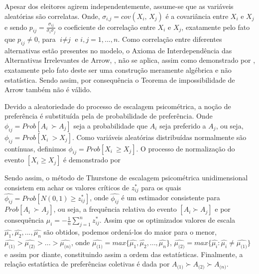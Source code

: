 \documentclass[
	article,			%
	12pt,				%
	oneside,			%
	a4paper,			%
	english,			%
	brazil,				%
	]{abntex2}
\begin{document}
Apesar dos eleitores agirem independentemente, assume-se que as variáveis aleatórias são correlatas. Onde, $\sigma_\textit{i,j} = cov(X_\textit{i}, \, X_\textit{j})$ é a covariância entre $X_\textit{i}$ e $X_\textit{j}$ e sendo $p_\textit{ij} =  \frac{\sigma_\textit{ij}}{\sigma_\textit{i} \sigma_\textit{j}}$ o coeficiente de correlação entre 
$X_\textit{i}$ e $X_\textit{j}$, exatamente pelo fato que $p_\textit{ij} \neq 0$, para $\textit{i} \neq \textit{j}$ e $\textit{i}, \textit{j} = 1, ... , \textit{n}$. Como correlação entre diferentes alternativas estão presentes no modelo, o Axioma de Interdependência das Alternativas Irrelevantes de Arrow, , não se aplica, assim como demonstrado por , exatamente pelo fato deste ser uma construção meramente algébrica e não estatística. Sendo assim, por consequência o Teorema de impossibilidade de Arrow também não é válido.

Devido a aleatoriedade do processo de escalagem psicométrica, a noção de preferência é substituída pela de probabilidade de preferência. Onde $\phi_\textit{ij} = Prob[A_\textit{i} \ \succ A_\textit{j}]$ seja a probabilidade que $A_\textit{i}$ seja preferido a $A_\textit{j}$, ou seja, $\phi_\textit{ij} = Prob[X_\textit{i} \ > X_\textit{j}]$. Como variáveis aleatórias distribuídas normalmente são contínuas, definimos 
$\phi_\textit{ij} = Prob[X_\textit{i} \ \geq X_\textit{j}]$. O processo de normalização do evento $[X_\textit{i} \geq X_\textit{j}]$ é demonstrado por 

Sendo assim, o método de Thurstone de escalagem psicométrica unidimensional consistem em achar os valores críticos de $z^*_\textit{ij}$ para os quais $\hat {\phi_\textit{ij}} = Prob[N(0,1) \geq z^*_\textit{ij}]$, onde $\hat {\phi_\textit{ij}}$ é um estimador consistente para $Prob[A_\textit{i} \ \succ A_\textit{j}]$, ou seja, a frequência relativa do evento $[A_\textit{i} \succ A_\textit{j}]$ e por consequência $\hat {\mu_\textit{i}} = - \frac{1}{n} \sum_{j=1}^{n} z^*_\textit{ij}$. Assim que os optimizados valores de escala $\hat {\mu_\textit{1}}, \hat {\mu_\textit{2}}, ..., \hat {\mu_\textit{n}}$ são obtidos, podemos ordená-los do maior para o menor, $\hat {\mu_\textit{(1)}} > \hat {\mu_\textit{(2)}} >  ... > \hat {\mu_\textit{(n)}}$, onde $\hat {\mu_\textit{(1)}} = max \{ \hat {\mu_\textit{1}}, \hat {\mu_\textit{2}}, ..., \hat {\mu_\textit{n}} \}$, $\hat {\mu_\textit{(2)}} = max \{ \hat {\mu_\textit{i}} : \hat {\mu_\textit{i}} \neq \hat {\mu_\textit{(1)}} \}$ e assim por diante, constituindo assim a ordem das estatísticas. Finalmente, a relação estatística de preferências coletivas é dada por $A_\textit{(1)} \succ A_\textit{(2)} \succ A_\textit{(n)}$.
 
\end{document}
